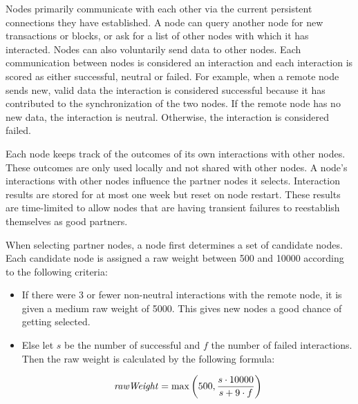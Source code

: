 Nodes primarily communicate with each other via the current persistent connections they have established.
A node can query another node for new transactions or blocks, or ask for a list of other nodes with which it has interacted.
Nodes can also voluntarily send data to other nodes.
Each communication between nodes is considered an interaction and each interaction is scored as either successful, neutral or failed.
For example, when a remote node sends new, valid data the interaction is considered successful because it has contributed to the synchronization of the two nodes.
If the remote node has no new data, the interaction is neutral.
Otherwise, the interaction is considered failed.

Each node keeps track of the outcomes of its own interactions with other nodes.
These outcomes are only used locally and not shared with other nodes.
A node's interactions with other nodes influence the partner nodes it selects.
Interaction results are stored for at most one week but reset on node restart.
These results are time-limited to allow nodes that are having transient failures to reestablish themselves as good partners.

When selecting partner nodes, a node first determines a set of candidate nodes.
Each candidate node is assigned a raw weight between 500 and 10000 according to the following criteria:

\begin{itemize}
\item If there were 3 or fewer non-neutral interactions with the remote node, it is given a medium raw weight of 5000.
This gives new nodes a good chance of getting selected.
\item Else let $s$ be the number of successful and $f$ the number of failed interactions.
Then the raw weight is calculated by the following formula:

\begin{figure}[t!]
\end{figure}

\begin{align*}
\mathit{rawWeight} = \max\left(500, \frac{s \cdot 10000}{s + 9 \cdot f}\right)
\end{align*}
\end{itemize}

